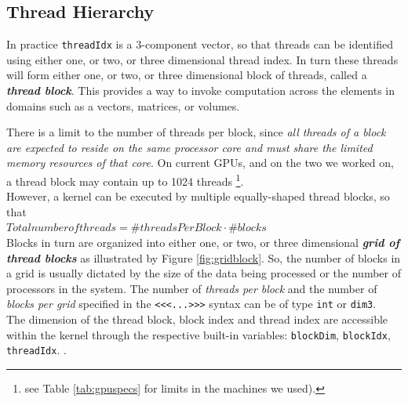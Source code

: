 	\subsection{Thread Hierarchy}  
	In practice \texttt{threadIdx} is a 3-component vector, so that threads can be identified using either one, or two, or three dimensional thread index.
	In turn these threads will form	either one, or two, or three dimensional block of threads, called a
	\textbf{\textit{thread block}}.
	This provides a way to invoke computation across the elements in domains such as a vectors, matrices, or volumes.
		
		
	There is a limit to the number of threads per block, since \textit{all threads of a block are expected to reside on the same processor core and must share the limited memory resources of that core}. On current GPUs, and on the two we worked on, a thread block may contain up to 1024 threads \footnote{see Table \ref{tab:gpuspecs} for limits in the machines we used).}.\\
	However, a kernel can be executed by multiple equally-shaped thread blocks, so that\\
	\(Total number of threads = \#threadsPerBlock \cdot \#blocks\)\\	 
	Blocks in turn are organized into either one, or two, or three dimensional \textit{\textbf{grid of thread blocks}} as illustrated by Figure \ref{fig:gridblock}.	
	So, the number of blocks in a grid is usually dictated by the size of the data being processed or the number of processors in the system.
	The number of \textit{threads per block} and the number of \textit{blocks per grid} specified in the 	\texttt{<<<...>>>} syntax can be of type \texttt{int} or \texttt{dim3}.\\
	The dimension of the thread block, block index and thread index are accessible within the kernel through the respective built-in variables: \texttt{blockDim}, \texttt{blockIdx}, \texttt{threadIdx}. \cite{cudaguide}.

